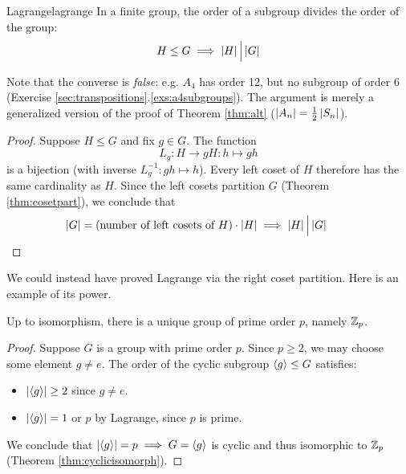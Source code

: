 \begin{thm}{Lagrange}{lagrange}
	In a finite group, the order of a subgroup divides the order of the group:\footnotemark
	\[
		H\le G\implies \left| H\right|\Big\vert \left| G\right|
	\]
\end{thm}

Note that the converse is \emph{false}: e.g.{} $A_4$ has order 12, but no subgroup of order 6 (Exercise \ref*{sec:transpositions}.\ref{exs:a4subgroups}). The argument is merely a generalized version of the proof of Theorem \ref{thm:alt} ($\left| A_n\right|=\frac 12\left| S_n\right|$).



\begin{proof}
	Suppose $H\le G$ and fix $g\in G$. The function
	\[
		L_g:H\to gH:h\mapsto gh
	\]
	is a bijection (with inverse $L_g^{-1}:gh\mapsto h$). Every left coset of $H$ therefore has the same cardinality as $H$. Since the left cosets partition $G$ (Theorem \ref{thm:cosetpart}), we conclude that
	\[
		\left| G\right|=\text{(number of left cosets of $H$)}\cdot \left| H\right|
		\implies \left| H\right|\Big\vert \left| G\right|
		\tag*{\qedhere}
	\]
\end{proof}


We could instead have proved Lagrange via the right coset partition. Here is an example of its power.

\begin{cor}{}{}
	Up to isomorphism, there is a unique group of prime order $p$, namely $\mathbb{Z}_p$.
\end{cor}

\begin{proof}
	Suppose $G$ is a group with prime order $p$. Since $p\ge 2$, we may choose some element $g\neq e$. The order of the cyclic subgroup $\left\langle g\right\rangle\le G$ satisfies:
	\begin{itemize}%
	  \item $\left| \left\langle g\right\rangle\right|\ge 2$ since $g\neq e$.
	  \item $\left| \left\langle g\right\rangle\right|=1$ or $p$ by Lagrange, since $p$ is prime.
	\end{itemize}
	We conclude that $\left| \left\langle g\right\rangle\right|=p\implies G=\left\langle g\right\rangle$ is cyclic and thus isomorphic to $\mathbb{Z}_p$ (Theorem \ref{thm:cyclicisomorph}).
\end{proof}


